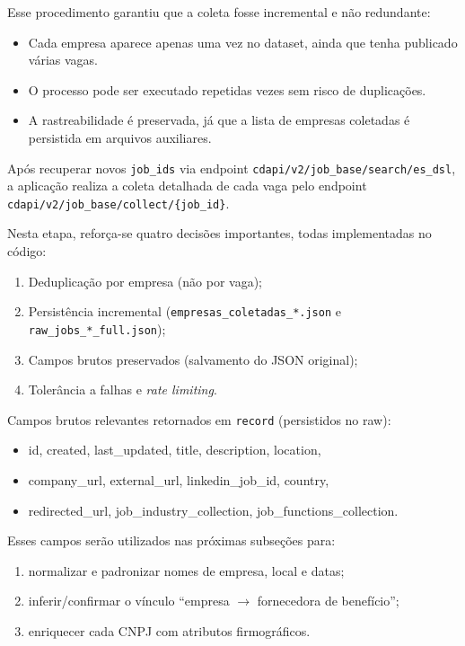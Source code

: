 Esse procedimento garantiu que a coleta fosse incremental e não redundante:
\begin{itemize}
    \item Cada empresa aparece apenas uma vez no dataset, ainda que tenha publicado várias vagas.
    \item O processo pode ser executado repetidas vezes sem risco de duplicações.
    \item A rastreabilidade é preservada, já que a lista de empresas coletadas é persistida em arquivos auxiliares.
\end{itemize}

Após recuperar novos \texttt{job\_ids} via endpoint \texttt{cdapi/v2/job\_base/search/es\_dsl}, a aplicação realiza a coleta detalhada de cada vaga pelo endpoint \texttt{cdapi/v2/job\_base/collect/\{job\_id\}}.

Nesta etapa, reforça-se quatro decisões importantes, todas implementadas no código:
\begin{enumerate}
    \item Deduplicação por empresa (não por vaga);
    \item Persistência incremental (\texttt{empresas\_coletadas\_*.json} e \texttt{raw\_jobs\_*\_full.json});
    \item Campos brutos preservados (salvamento do JSON original);
    \item Tolerância a falhas e \textit{rate limiting}.
\end{enumerate}

Campos brutos relevantes retornados em \texttt{record} (persistidos no raw):
\begin{itemize}
    \item id, created, last\_updated, title, description, location,
    \item company\_url, external\_url, linkedin\_job\_id, country,
    \item redirected\_url, job\_industry\_collection, job\_functions\_collection.
\end{itemize}

Esses campos serão utilizados nas próximas subseções para:
\begin{enumerate}
    \item normalizar e padronizar nomes de empresa, local e datas;
    \item inferir/confirmar o vínculo ``empresa $\to$ fornecedora de benefício'';
    \item enriquecer cada CNPJ com atributos firmográficos.
\end{enumerate}

